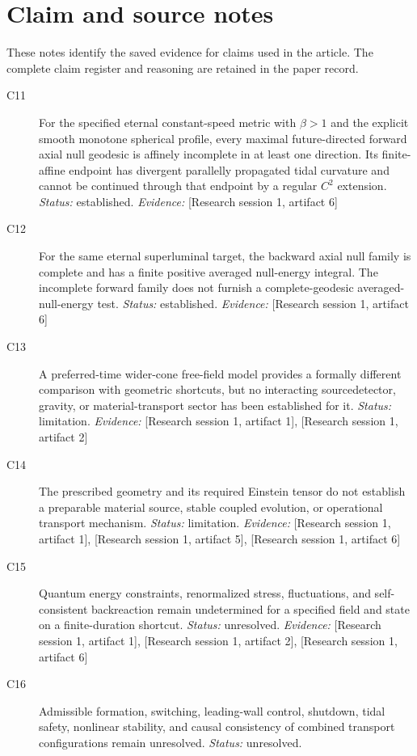 \documentclass[11pt]{article}
\begin{document}
\section{Claim and source notes}
These notes identify the saved evidence for claims used in the article. The complete claim register and reasoning are retained in the paper record.
\begin{sloppypar}
\small
\begin{description}
\item[C11] For the specified eternal constant-speed metric with $\beta>1$ and the explicit smooth monotone spherical profile, every maximal future-directed forward axial null geodesic is affinely incomplete in at least one direction. Its finite-affine endpoint has divergent parallelly propagated tidal curvature and cannot be continued through that endpoint by a regular $C^2$ extension. \textit{Status: }established.
\textit{Evidence: }[Research session 1, artifact 6]
\item[C12] For the same eternal superluminal target, the backward axial null family is complete and has a finite positive averaged null-energy integral. The incomplete forward family does not furnish a complete-geodesic averaged-null-energy test. \textit{Status: }established.
\textit{Evidence: }[Research session 1, artifact 6]
\item[C13] A preferred-time wider-cone free-field model provides a formally different comparison with geometric shortcuts, but no interacting source\textendash{}\allowbreak{}detector, gravity, or material-transport sector has been established for it. \textit{Status: }limitation.
\textit{Evidence: }[Research session 1, artifact 1], [Research session 1, artifact 2]
\item[C14] The prescribed geometry and its required Einstein tensor do not establish a preparable material source, stable coupled evolution, or operational transport mechanism. \textit{Status: }limitation.
\textit{Evidence: }[Research session 1, artifact 1], [Research session 1, artifact 5], [Research session 1, artifact 6]
\item[C15] Quantum energy constraints, renormalized stress, fluctuations, and self-consistent backreaction remain undetermined for a specified field and state on a finite-duration shortcut. \textit{Status: }unresolved.
\textit{Evidence: }[Research session 1, artifact 1], [Research session 1, artifact 2], [Research session 1, artifact 6]
\item[C16] Admissible formation, switching, leading-wall control, shutdown, tidal safety, nonlinear stability, and causal consistency of combined transport configurations remain unresolved. \textit{Status: }unresolved.

\end{description}
\end{sloppypar}
\end{document}

